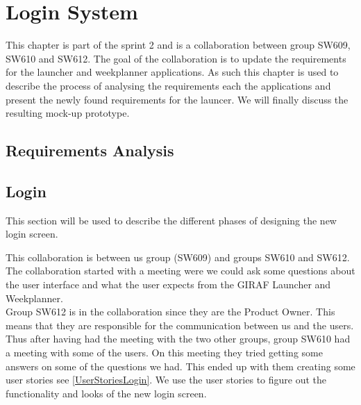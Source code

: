 \chapter{Login System}\label{sec:LoginColab}
This chapter is part of the sprint 2 and is a collaboration between group
SW609, SW610 and SW612. The goal of the collaboration is to update the
requirements for the launcher and weekplanner applications. As such this
chapter is used to describe the process of analysing the requirements each the
applications and present the newly found requirements for the launcer. We will
finally discuss the resulting mock-up prototype. 

\section{Requirements Analysis}


\section{Login}
This section will be used to describe the different phases of designing the new
login screen.

This collaboration is between us group (SW609) and groups SW610 and SW612. The
collaboration started with a meeting were we could ask some questions about the
user interface and what the user expects from the GIRAF Launcher and
Weekplanner. \\
Group SW612 is in the collaboration since they are the Product Owner. This means
that they are responsible for the communication between us and the users. Thus
after having had the meeting with the two other groups, group SW610 had a
meeting with some of the users. On this meeting they tried getting some answers
on some of the questions we had. This ended up with them creating some user
stories see \autoref{UserStoriesLogin}. We use the user stories to figure out
the functionality and looks of the new login screen. 

